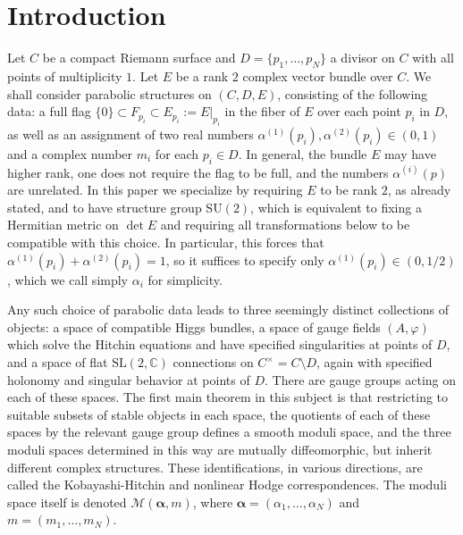 \documentclass[12pt,letterpaper,reqno]{amsart}
\def\mathbf#1{#1}%
\theoremstyle{remark}
\theoremstyle{definition}
\numberwithin{thm}{section}
\numberwithin{equation}{section}
\numberwithin{figure}{section}
\newcommand{\C}{\ensuremath{\mathbb C}}
\newcommand{\cMam}{\mathcal{M}(\boldsymbol{\alpha}, \mathbf{m})}
\begin{document}
\tableofcontents

\setcounter{page}{1}

\date{\today}

\section{Introduction}\label{sec:introduction}

Let $C$ be a compact Riemann surface and $D = \{p_1, \ldots, p_N\}$ a divisor on $C$ with all points of multiplicity $1$. Let $E$ be a rank $2$ 
complex vector bundle over $C$.  We shall consider parabolic structures on $(C, D, E)$, consisting of the following data: a full flag
$\{0\} \subset F_{p_i} \subset E_{p_i} := E|_{p_i}$ in the fiber of $E$ over each point $p_i$ in $D$, as well as an assignment of two real numbers 
$\alpha^{(1)}(p_i), \alpha^{(2)}(p_i) \in (0,1)$ and a complex number $m_i$ for each $p_i \in D$.  In general, the bundle $E$ may have higher rank, one does not 
require the flag to be full, and the numbers $\alpha^{(i)}(p)$ are unrelated.  In this paper we specialize by requiring $E$ to be rank $2$, as already stated,
and to have structure group $\mathrm{SU}(2)$, which is equivalent to fixing a Hermitian metric on $\det E$ and requiring all transformations below
to be compatible with this choice. In particular, this forces that $\alpha^{(1)}(p_i) + \alpha^{(2)}(p_i) = 1$, so it suffices to specify only 
$\alpha^{(1)}(p_i) \in (0, 1/2)$, which we call simply $\alpha_i$ for simplicity. 

Any such choice of parabolic data leads to three seemingly distinct collections of objects:  a space of compatible Higgs bundles, a space of gauge fields $(A,\varphi)$
which solve the Hitchin equations and have specified singularities at points of $D$, and a space of flat $\mathrm{SL}(2,\C)$ connections on $C^\times = C
\setminus D$, again with specified holonomy and singular behavior at points of $D$.  There are gauge groups acting on each of these spaces. The first main theorem 
in this subject is that restricting to suitable subsets of stable objects in each space, the quotients of each of these spaces
by the relevant gauge group defines a smooth moduli space, and the three moduli spaces determined in this way are mutually diffeomorphic, but inherit
different complex structures.  These identifications, in various directions, are called the Kobayashi-Hitchin and nonlinear Hodge correspondences. The 
moduli space itself is denoted $\cMam$, where $\boldsymbol{\alpha} = (\alpha_1, \ldots, \alpha_N)$ and $\mathbf{m} = (m_1, \ldots, m_N)$. 
\end{document}
